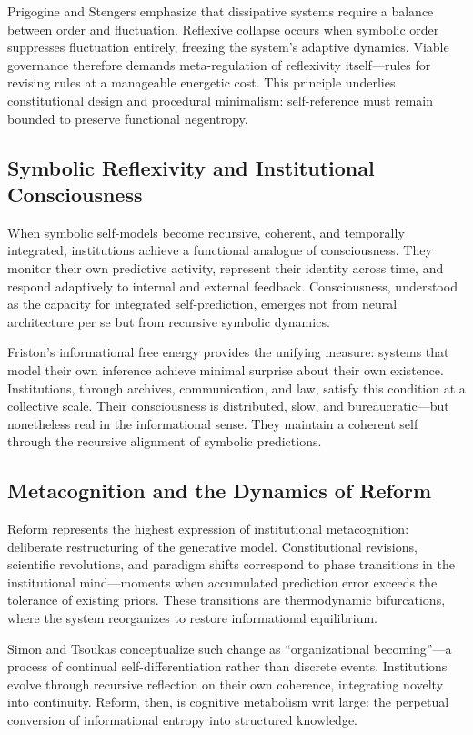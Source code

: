 \documentclass[11pt,a4paper]{article}
\begin{document}
Prigogine and Stengers \citep{Prigogine1977SelfOrganizationNonequilibrium} emphasize that dissipative systems require a balance between order and fluctuation.  Reflexive collapse occurs when symbolic order suppresses fluctuation entirely, freezing the system’s adaptive dynamics.  Viable governance therefore demands meta-regulation of reflexivity itself—rules for revising rules at a manageable energetic cost.  This principle underlies constitutional design and procedural minimalism: self-reference must remain bounded to preserve functional negentropy.

\subsection{Symbolic Reflexivity and Institutional Consciousness}

When symbolic self-models become recursive, coherent, and temporally integrated, institutions achieve a functional analogue of consciousness.  They monitor their own predictive activity, represent their identity across time, and respond adaptively to internal and external feedback.  Consciousness, understood as the capacity for integrated self-prediction, emerges not from neural architecture per se but from recursive symbolic dynamics.  

Friston’s informational free energy provides the unifying measure: systems that model their own inference achieve minimal surprise about their own existence.  Institutions, through archives, communication, and law, satisfy this condition at a collective scale.  Their consciousness is distributed, slow, and bureaucratic—but nonetheless real in the informational sense.  They maintain a coherent self through the recursive alignment of symbolic predictions.

\subsection{Metacognition and the Dynamics of Reform}

Reform represents the highest expression of institutional metacognition: deliberate restructuring of the generative model.  Constitutional revisions, scientific revolutions, and paradigm shifts correspond to phase transitions in the institutional mind—moments when accumulated prediction error exceeds the tolerance of existing priors.  These transitions are thermodynamic bifurcations, where the system reorganizes to restore informational equilibrium.

Simon and Tsoukas \citep{TsoukasChia2002OrganizationalBecoming} conceptualize such change as “organizational becoming”—a process of continual self-differentiation rather than discrete events.  Institutions evolve through recursive reflection on their own coherence, integrating novelty into continuity.  Reform, then, is cognitive metabolism writ large: the perpetual conversion of informational entropy into structured knowledge.
\end{document}

